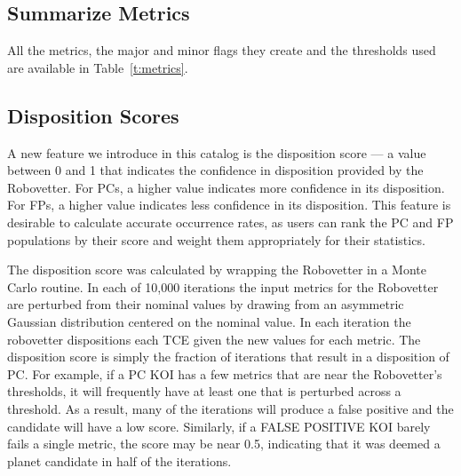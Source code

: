

\subsection{Summarize Metrics}
All the metrics, the major and minor flags they create and the thresholds used are available in Table~\ref{t:metrics}.


\subsection{Disposition Scores}
\label{s:scores}
A new feature we introduce in this catalog is the disposition score --- a value between 0 and 1 that indicates the confidence in disposition provided by the Robovetter. For PCs, a higher value indicates more confidence in its disposition. For FPs, a higher value indicates less confidence in its disposition. This feature is desirable to calculate accurate occurrence rates, as users can rank the PC and FP populations by their score and weight them appropriately for their statistics.

The disposition score was calculated by wrapping the Robovetter in a Monte Carlo routine. In each of 10,000 iterations the input metrics for the Robovetter are perturbed from their nominal values by drawing from an asymmetric Gaussian distribution centered on the nominal value. In each iteration the robovetter dispositions each TCE given the new values for each metric. The disposition score is simply the fraction of iterations that result in a disposition of PC. For example, if a PC KOI has a few metrics that are near the Robovetter's thresholds, it will frequently have at least one that is perturbed across a threshold. As a result, many of the iterations will produce a false positive and the candidate will have a low score.  Similarly, if a FALSE POSITIVE KOI barely fails a single metric, the score may be near 0.5, indicating that it was deemed a planet candidate in half of the iterations.

